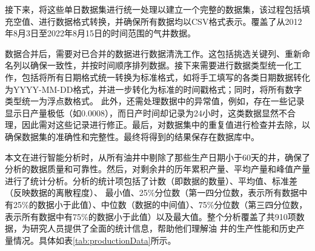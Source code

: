 接下来，将这些单日数据集进行统一处理以建立一个完整的数据集，该过程包括填充空值、进行数据格式转换，并确保所有数据均以CSV格式表示。覆盖了从2012年8月3日至2022年8月15日的时间范围的气井数据。

数据合并后，需要对已合并的数据进行数据清洗工作。这包括挑选关键列、重新命名列以确保一致性，并按时间顺序排列数据。接下来需要进行数据类型统一化工作，包括将所有日期格式统一转换为标准格式，如将手工填写的各类日期数据转化为YYYY-MM-DD格式，并进一步转化为标准的时间戳格式；同时，将所有数字类型统一为浮点数格式。
此外，还需处理数据中的异常值，例如，存在一些记录显示日产量极低（如0.0008），而日产时间却记录为24小时，这类数据显然不合理，因此需对这些记录进行修正。最后，对数据集中的重复值进行检查并去除，以确保数据集的准确性和完整性。最终将得到的结果保存在数据库中。
\begin{table}[H]
    \renewcommand{\arraystretch}{1.5} %
    \centering
    \caption{产量统计数据表}
    \label{tab:productionData}
\end{table}

本文在进行智能分析时，从所有油井中剔除了那些生产日期小于60天的井，确保了分析的数据质量和可靠性。然后，对剩余井的历年累积产量、平均产量和峰值产量进行了统计分析。分析的统计项包括了计数（即数据的数量）、平均值、标准差（反映数据的离散程度）、
最小值、25\%分位数（第一四分位数，表示所有数据中有25\%的数据小于此值）、中位数（数据的中间值）、75\%分位数（第三四分位数，表示所有数据中有75\%的数据小于此值）以及最大值。整个分析覆盖了共910项数据，为研究人员提供了全面的统计信息，帮助他们理解油
井的生产性能和历史产量情况。具体如表\ref{tab:productionData}所示。


